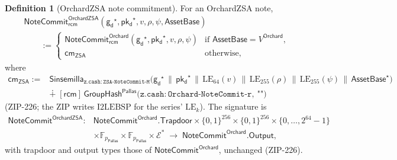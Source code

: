\documentclass[11pt,a4paper]{article}
\theoremstyle{definition}
\newtheorem{definition}[theorem]{Definition}
\newcommand{\F}{\mathbb{F}}
\newcommand{\cmsym}{\mathsf{cm}}
\newcommand{\Pallas}{\ensuremath{\mathsf{Pallas}}}
\newcommand{\Ep}{\ensuremath{\mathcal{E}}}
\newcommand{\NoteCommit}{\ensuremath{\mathsf{NoteCommit}}}
\newcommand{\Sinsemilla}{\ensuremath{\mathsf{Sinsemilla}}}
\newcommand{\GroupHash}{\ensuremath{\mathsf{GroupHash}}}
\newcommand{\pkd}{\ensuremath{\mathsf{pk_d}}}
\newcommand{\gd}{\ensuremath{\mathsf{g_d}}}
\newcommand{\rcm}{\ensuremath{\mathsf{rcm}}}
\begin{document}
\begin{definition}[OrchardZSA note commitment]\label{def:zsa-notecommit}
For an OrchardZSA note,
\[
\begin{aligned}
&\NoteCommit^{\mathsf{OrchardZSA}}_{\rcm}(\gd^\star, \pkd^\star, v, \rho, \psi,
  \mathsf{AssetBase}) \\
&\qquad :=
\begin{cases}
\NoteCommit^{\mathsf{Orchard}}_{\rcm}(\gd^\star, \pkd^\star, v, \rho, \psi)
  & \text{if } \mathsf{AssetBase} = V^{\mathsf{Orchard}}, \\
\cmsym_{\mathsf{ZSA}} & \text{otherwise},
\end{cases}
\end{aligned}
\]
where
\[
\begin{aligned}
\cmsym_{\mathsf{ZSA}} :={}&
  \Sinsemilla_{\mathtt{z.cash:ZSA\text{-}NoteCommit\text{-}M}}
  \bigl(\gd^\star \,\|\, \pkd^\star \,\|\, \mathrm{LE}_{64}(v) \,\|\,
  \mathrm{LE}_{255}(\rho) \,\|\, \mathrm{LE}_{255}(\psi) \,\|\,
  \mathsf{AssetBase}^\star\bigr) \\
&\dotplus\; [\rcm]\,
  \GroupHash^{\Pallas}\bigl(\mathtt{z.cash:Orchard\text{-}NoteCommit\text{-}r},
  \ \texttt{""}\bigr)
\end{aligned}
\]
(ZIP-226; the ZIP writes $\mathrm{I2LEBSP}$ for the series'
$\mathrm{LE}_k$). The signature is
\[
\begin{aligned}
\NoteCommit^{\mathsf{OrchardZSA}} :{}&
  \NoteCommit^{\mathsf{Orchard}}.\mathsf{Trapdoor}
  \times \{0,1\}^{256} \times \{0,1\}^{256}
  \times \{0, \dots, 2^{64}-1\} \\
&\times \F_{p_{\Pallas}} \times \F_{p_{\Pallas}}
  \times \Ep^{*}
  \;\to\; \NoteCommit^{\mathsf{Orchard}}.\mathsf{Output},
\end{aligned}
\]
with trapdoor and output types those of $\NoteCommit^{\mathsf{Orchard}}$,
unchanged (ZIP-226).
\end{definition}
\end{document}
